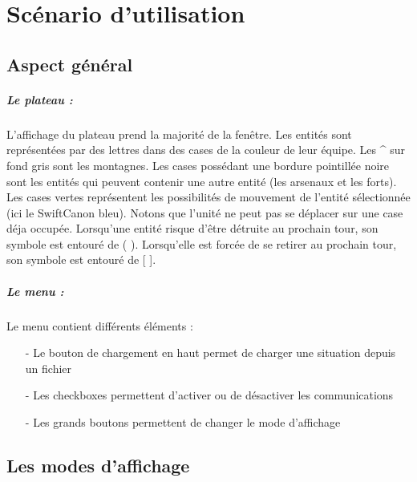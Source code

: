 \chapter{Scénario d'utilisation}

	\section{Aspect général}

		\paragraph{Le plateau :}
			L'affichage du plateau prend la majorité de la fenêtre.
			Les entités sont représentées par des lettres dans des cases de la couleur de leur équipe.
			Les \^{} sur fond gris sont les montagnes.
			Les cases possédant une bordure pointillée noire sont les entités qui peuvent contenir une autre entité	(les arsenaux et les forts).
			Les cases vertes représentent les possibilités de mouvement	de l'entité sélectionnée (ici le SwiftCanon bleu). 
			Notons que l'unité ne peut pas se déplacer sur une case déja occupée.
			Lorsqu'une entité risque d'être détruite au prochain tour, son symbole est entouré de ( ).
			Lorsqu'elle est forcée de se retirer au prochain tour, son symbole est entouré de [ ].
	
		\paragraph{Le menu :}
	
			Le menu contient différents éléments :
			\begin{itemize}
			\item[-]Le bouton de chargement en haut permet de charger une situation depuis un fichier
			\item[-]Les checkboxes permettent d'activer ou de désactiver les communications
			\item[-]Les grands boutons permettent de changer le mode d'affichage
			\end{itemize}

	\section{Les modes d'affichage}

